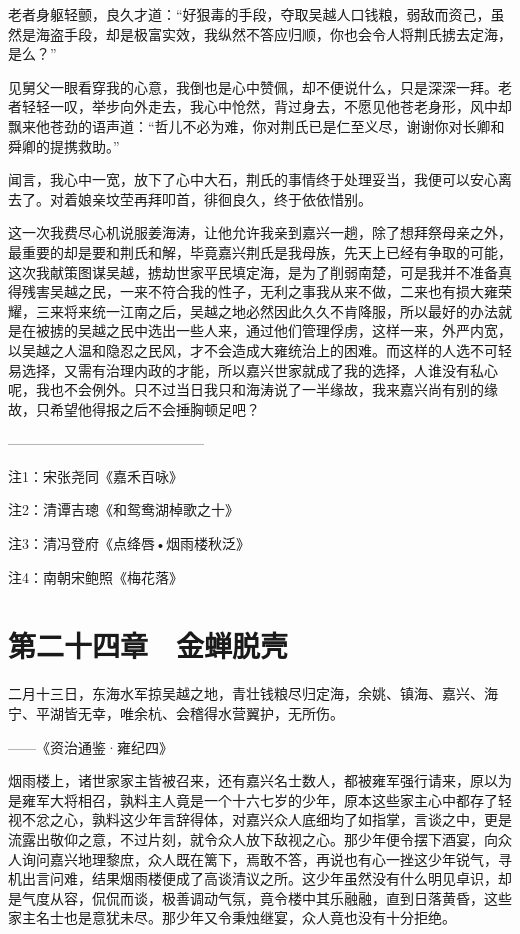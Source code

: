 老者身躯轻颤，良久才道：“好狠毒的手段，夺取吴越人口钱粮，弱敌而资己，虽然是海盗手段，却是极富实效，我纵然不答应归顺，你也会令人将荆氏掳去定海，是么？”

见舅父一眼看穿我的心意，我倒也是心中赞佩，却不便说什么，只是深深一拜。老者轻轻一叹，举步向外走去，我心中怆然，背过身去，不愿见他苍老身形，风中却飘来他苍劲的语声道：“哲儿不必为难，你对荆氏已是仁至义尽，谢谢你对长卿和舜卿的提携救助。”

闻言，我心中一宽，放下了心中大石，荆氏的事情终于处理妥当，我便可以安心离去了。对着娘亲坟茔再拜叩首，徘徊良久，终于依依惜别。

这一次我费尽心机说服姜海涛，让他允许我亲到嘉兴一趟，除了想拜祭母亲之外，最重要的却是要和荆氏和解，毕竟嘉兴荆氏是我母族，先天上已经有争取的可能，这次我献策图谋吴越，掳劫世家平民填定海，是为了削弱南楚，可是我并不准备真得残害吴越之民，一来不符合我的性子，无利之事我从来不做，二来也有损大雍荣耀，三来将来统一江南之后，吴越之地必然因此久久不肯降服，所以最好的办法就是在被掳的吴越之民中选出一些人来，通过他们管理俘虏，这样一来，外严内宽，以吴越之人温和隐忍之民风，才不会造成大雍统治上的困难。而这样的人选不可轻易选择，又需有治理内政的才能，所以嘉兴世家就成了我的选择，人谁没有私心呢，我也不会例外。只不过当日我只和海涛说了一半缘故，我来嘉兴尚有别的缘故，只希望他得报之后不会捶胸顿足吧？

——————————————

注1：宋张尧同《嘉禾百咏》

注2：清谭吉璁《和鸳鸯湖棹歌之十》

注3：清冯登府《点绛唇•烟雨楼秋泛》

注4：南朝宋鲍照《梅花落》

\chapter{第二十四章　金蝉脱壳}

二月十三日，东海水军掠吴越之地，青壮钱粮尽归定海，余姚、镇海、嘉兴、海宁、平湖皆无幸，唯余杭、会稽得水营翼护，无所伤。

——《资治通鉴·雍纪四》

烟雨楼上，诸世家家主皆被召来，还有嘉兴名士数人，都被雍军强行请来，原以为是雍军大将相召，孰料主人竟是一个十六七岁的少年，原本这些家主心中都存了轻视不忿之心，孰料这少年言辞得体，对嘉兴众人底细均了如指掌，言谈之中，更是流露出敬仰之意，不过片刻，就令众人放下敌视之心。那少年便令摆下酒宴，向众人询问嘉兴地理黎庶，众人既在篱下，焉敢不答，再说也有心一挫这少年锐气，寻机出言问难，结果烟雨楼便成了高谈清议之所。这少年虽然没有什么明见卓识，却是气度从容，侃侃而谈，极善调动气氛，竟令楼中其乐融融，直到日落黄昏，这些家主名士也是意犹未尽。那少年又令秉烛继宴，众人竟也没有十分拒绝。

